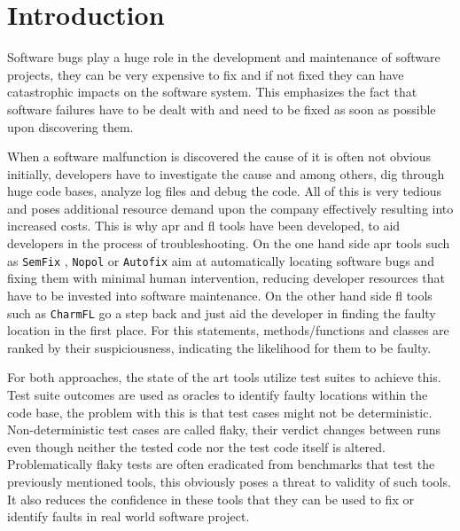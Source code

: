 \documentclass[
fancyheadings, %
%
%
]{stsreprt}
\begin{document}
\chapter{Introduction}
Software bugs play a huge role in the development and maintenance of software projects, they can be very expensive to fix and if not fixed they can have catastrophic impacts on the software system. 
This emphasizes the fact that software failures have to be dealt with and need to be fixed as soon as possible upon discovering them. \par
When a software malfunction is discovered the cause of it is often not obvious initially, developers have to investigate the cause and among others, dig through huge code bases, analyze log files and debug the code. 
All of this is very tedious and poses additional resource demand upon the company effectively resulting into increased costs. 
This is why \acrlong{apr} and \acrlong{fl} tools have been developed, to aid developers in the process of troubleshooting. 
On the one hand side \acrshort{apr} tools such as \texttt{SemFix} \cite{semfix:2013}, \texttt{Nopol} \cite{nopol:2017} or \texttt{Autofix} \cite{autofix:2014} aim at automatically locating software bugs and fixing them with minimal human intervention, reducing developer resources that have to be invested into software maintenance.
On the other hand side \acrshort{fl} tools such as \texttt{CharmFL} \cite{charmfl:2021} go a step back and just aid the developer in finding the faulty location in the first place. 
For this statements, methods/functions and classes are ranked by their suspiciousness, indicating the likelihood for them to be faulty.  \par
For both approaches, the state of the art tools utilize test suites to achieve this. 
Test suite outcomes are used as oracles to identify faulty locations within the code base, the problem with this is that test cases might not be deterministic.
Non-deterministic test cases are called flaky, their verdict changes between runs even though neither the tested code nor the test code itself is altered. 
Problematically flaky tests are often eradicated from benchmarks that test the previously mentioned tools, this obviously poses a threat to validity of such tools. It also reduces the confidence in these tools that they can be used to fix or identify faults in real world 
software project. \par
\end{document}
